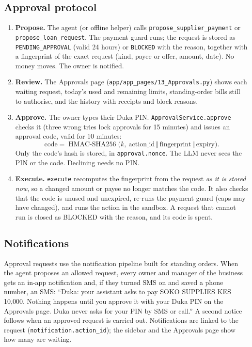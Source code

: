 \documentclass[10pt,a4paper]{article}
\newcommand{\code}[1]{\texttt{\small #1}}
\begin{document}
\subsection{Approval protocol}
\begin{enumerate}
  \item \textbf{Propose.} The agent (or offline helper) calls \code{propose\_supplier\_payment} or \code{propose\_loan\_request}. The payment guard runs; the request is stored as \code{PENDING\_APPROVAL} (valid 24 hours) or \code{BLOCKED} with the reason, together with a fingerprint of the exact request (kind, payee or offer, amount, date). No money moves. The owner is notified.
  \item \textbf{Review.} The Approvals page (\code{app/app\_pages/13\_Approvals.py}) shows each waiting request, today's used and remaining limits, standing-order bills still to authorise, and the history with receipts and block reasons.
  \item \textbf{Approve.} The owner types their Duka PIN. \code{ApprovalService.approve} checks it (three wrong tries lock approvals for 15 minutes) and issues an approval code, valid for 10 minutes:
\[ \text{code}=\operatorname{HMAC\text{-}SHA256}\bigl(k,\ \text{action\_id}\,\Vert\,\text{fingerprint}\,\Vert\,\text{expiry}\bigr). \] Only the code's hash is stored, in \code{approval.nonce}. The LLM never sees the PIN or the code. Declining needs no PIN.
  \item \textbf{Execute.} \code{execute} recomputes the fingerprint from the request \emph{as it is stored now}, so a changed amount or payee no longer matches the code. It also checks that the code is unused and unexpired, re-runs the payment guard (caps may have changed), and runs the action in the sandbox. A request that cannot run is closed as BLOCKED with the reason, and its code is spent.
\end{enumerate}

\subsection{Notifications}
Approval requests use the notification pipeline built for standing orders. When the agent proposes an allowed request, every owner and manager of the business gets an in-app notification and, if they turned SMS on and saved a phone number, an SMS: ``Duka: your assistant asks to pay SOKO SUPPLIES KES 10{,}000. Nothing happens until you approve it with your Duka PIN on the Approvals page. Duka never asks for your PIN by SMS or call.'' A second notice follows when an approved request is carried out. Notifications are linked to the request (\code{notification.action\_id}); the sidebar and the Approvals page show how many are waiting.
\end{document}
